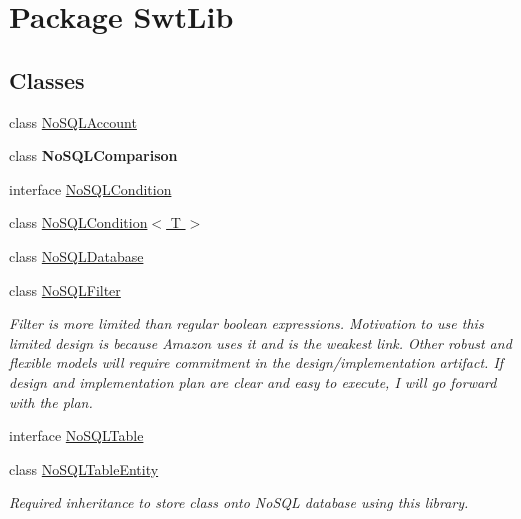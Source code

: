 \hypertarget{namespace_swt_lib}{\section{Package Swt\-Lib}
\label{namespace_swt_lib}
}
\subsection*{Classes}
\begin{DoxyCompactItemize}
\item 
class \hyperlink{class_swt_lib_1_1_no_s_q_l_account}{No\-S\-Q\-L\-Account}
\item 
class {\bfseries No\-S\-Q\-L\-Comparison}
\item 
interface \hyperlink{interface_swt_lib_1_1_no_s_q_l_condition}{No\-S\-Q\-L\-Condition}
\item 
class \hyperlink{class_swt_lib_1_1_no_s_q_l_condition_3_01_t_01_4}{No\-S\-Q\-L\-Condition$<$ T $>$}
\item 
class \hyperlink{class_swt_lib_1_1_no_s_q_l_database}{No\-S\-Q\-L\-Database}
\item 
class \hyperlink{class_swt_lib_1_1_no_s_q_l_filter}{No\-S\-Q\-L\-Filter}
\begin{DoxyCompactList}\small\item\em Filter is more limited than regular boolean expressions. Motivation to use this limited design is because Amazon uses it and is the weakest link. Other robust and flexible models will require commitment in the design/implementation artifact. If design and implementation plan are clear and easy to execute, I will go forward with the plan. \end{DoxyCompactList}\item 
interface \hyperlink{interface_swt_lib_1_1_no_s_q_l_table}{No\-S\-Q\-L\-Table}
\item 
class \hyperlink{class_swt_lib_1_1_no_s_q_l_table_entity}{No\-S\-Q\-L\-Table\-Entity}
\begin{DoxyCompactList}\small\item\em Required inheritance to store class onto No\-S\-Q\-L database using this library. \end{DoxyCompactList}\end{DoxyCompactItemize}
